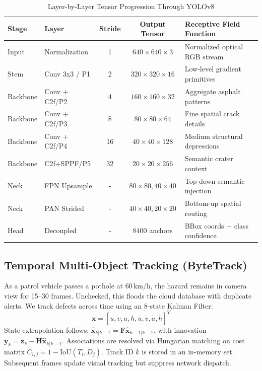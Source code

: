 \documentclass[conference]{IEEEtran}
\begin{document}
\begin{table}[htbp]
\caption{Layer-by-Layer Tensor Progression Through YOLOv8}
\begin{center}
\begin{tabular}{llccl}
\toprule
\textbf{Stage} & \textbf{Layer} & \textbf{Stride} & \textbf{Output Tensor} & \textbf{Receptive Field Function} \\
\midrule
Input    & Normalization & 1  & $640\times 640\times 3$  & Normalized optical RGB stream \\
Stem     & Conv 3x3 / P1 & 2  & $320\times 320\times 16$ & Low-level gradient primitives \\
Backbone & Conv + C2f/P2 & 4  & $160\times 160\times 32$ & Aggregate asphalt patterns \\
Backbone & Conv + C2f/P3 & 8  & $80\times 80\times 64$   & Fine spatial crack details \\
Backbone & Conv + C2f/P4 & 16 & $40\times 40\times 128$  & Medium structural depressions \\
Backbone & C2f+SPPF/P5   & 32 & $20\times 20\times 256$  & Semantic crater context \\
Neck     & FPN Upsample  & -  & $80\times 80, 40\times 40$ & Top-down semantic injection \\
Neck     & PAN Strided   & -  & $40\times 40, 20\times 20$ & Bottom-up spatial routing \\
Head     & Decoupled     & -  & 8400 anchors             & BBox coords + class confidence \\
\bottomrule
\end{tabular}
\label{tab:tensor_flow}
\end{center}
\end{table}

\subsection{Temporal Multi-Object Tracking (ByteTrack)}
As a patrol vehicle passes a pothole at 60\,km/h, the hazard remains in camera view for 15--30 frames. Unchecked, this floods the cloud database with duplicate alerts. We track defects across time using an 8-state Kalman Filter:
\begin{equation}
\mathbf{x} = [u, v, a, h, \dot{u}, \dot{v}, \dot{a}, \dot{h}]^T
\end{equation}
State extrapolation follows: $\hat{\mathbf{x}}_{k|k-1} = \mathbf{F} \hat{\mathbf{x}}_{k-1|k-1}$, with innovation $\mathbf{y}_k = \mathbf{z}_k - \mathbf{H} \hat{\mathbf{x}}_{k|k-1}$. Associations are resolved via Hungarian matching on cost matrix $C_{i,j} = 1 - \text{IoU}(T_i, D_j)$. Track ID $k$ is stored in an in-memory set. Subsequent frames update visual tracking but suppress network dispatch.
\end{document}
